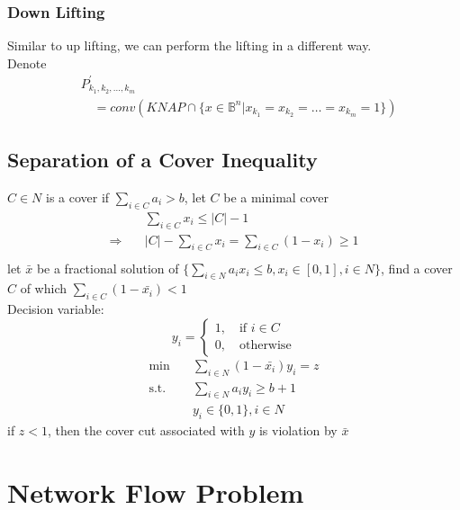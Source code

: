 				\subsection{Down Lifting}
					Similar to up lifting, we can perform the lifting in a different way.\\
					Denote
					\begin{align}
						&P_{k_1, k_2, ..., k_m}^\prime  \\
						&\quad =conv(KNAP\cap \{x\in \mathbb{B}^{n}|x_{k_1}=x_{k_2}=\dots=x_{k_m}=1\}) 
					\end{align}

			\section{Separation of a Cover Inequality}
				$C\in N$ is a cover if $\sum_{i\in C} a_i > b$, let $C$ be a minimal cover
				\begin{align}
					&\sum_{i\in C}x_i \le |C| - 1 \\
					\Rightarrow \quad & |C| - \sum_{i\in C}x_i = \sum_{i \in C}(1-x_i)\ge 1 \\
				\end{align}
				let $\bar{x}$ be a fractional solution of $\{\sum_{i\in N} a_ix_i \le b, x_i \in [0, 1], i\in N\}$, find a cover $C$ of which $\sum_{i\in C}(1-\bar{x_i})<1$\\
				Decision variable:
				\begin{equation}
					y_i = \begin{cases}1, \quad \text{if } i\in C\\ 0, \quad \text{otherwise}\end{cases}
				\end{equation}
				\begin{align}
					\min \quad & \sum_{i\in N} (1-\bar{x_i})y_i = z \\
					\text{s.t.} \quad & \sum_{i\in N}a_iy_i \ge b+1 \\
					&y_i \in \{0, 1\}, i\in N
				\end{align}
				if $z<1$, then the cover cut associated with $y$ is violation by $\bar{x}$

		\chapter{Network Flow Problem}
